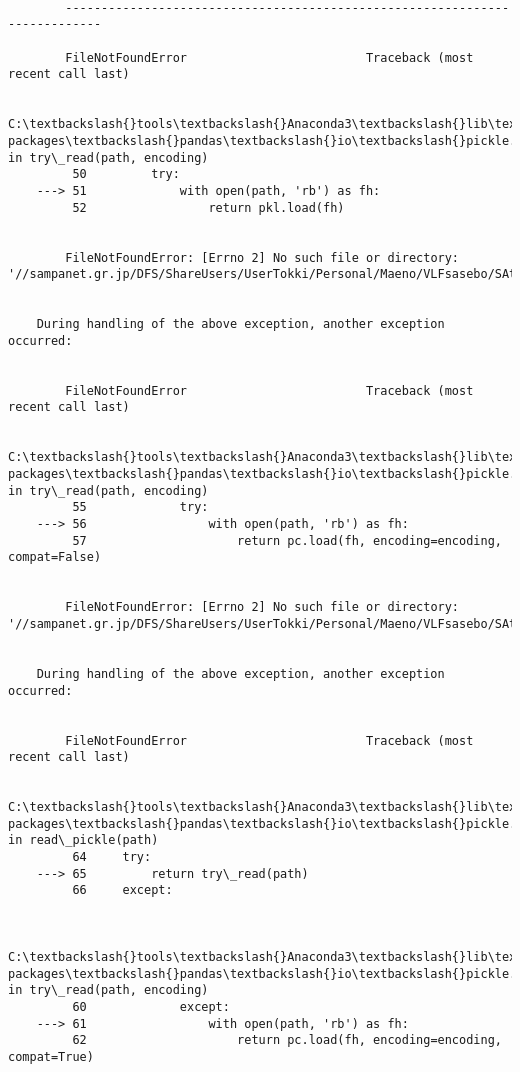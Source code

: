 \documentclass[a4paper,dvipdfmx]{jsarticle}
\begin{document}
    \begin{Verbatim}[commandchars=\\\{\}]

        ---------------------------------------------------------------------------

        FileNotFoundError                         Traceback (most recent call last)

        C:\textbackslash{}tools\textbackslash{}Anaconda3\textbackslash{}lib\textbackslash{}site-packages\textbackslash{}pandas\textbackslash{}io\textbackslash{}pickle.py in try\_read(path, encoding)
         50         try:
    ---> 51             with open(path, 'rb') as fh:
         52                 return pkl.load(fh)
    

        FileNotFoundError: [Errno 2] No such file or directory: '//sampanet.gr.jp/DFS/ShareUsers/UserTokki/Personal/Maeno/VLFsasebo/SAtraceViewResult/average\_SN.dump'

        
    During handling of the above exception, another exception occurred:
    

        FileNotFoundError                         Traceback (most recent call last)

        C:\textbackslash{}tools\textbackslash{}Anaconda3\textbackslash{}lib\textbackslash{}site-packages\textbackslash{}pandas\textbackslash{}io\textbackslash{}pickle.py in try\_read(path, encoding)
         55             try:
    ---> 56                 with open(path, 'rb') as fh:
         57                     return pc.load(fh, encoding=encoding, compat=False)
    

        FileNotFoundError: [Errno 2] No such file or directory: '//sampanet.gr.jp/DFS/ShareUsers/UserTokki/Personal/Maeno/VLFsasebo/SAtraceViewResult/average\_SN.dump'

        
    During handling of the above exception, another exception occurred:
    

        FileNotFoundError                         Traceback (most recent call last)

        C:\textbackslash{}tools\textbackslash{}Anaconda3\textbackslash{}lib\textbackslash{}site-packages\textbackslash{}pandas\textbackslash{}io\textbackslash{}pickle.py in read\_pickle(path)
         64     try:
    ---> 65         return try\_read(path)
         66     except:
    

        C:\textbackslash{}tools\textbackslash{}Anaconda3\textbackslash{}lib\textbackslash{}site-packages\textbackslash{}pandas\textbackslash{}io\textbackslash{}pickle.py in try\_read(path, encoding)
         60             except:
    ---> 61                 with open(path, 'rb') as fh:
         62                     return pc.load(fh, encoding=encoding, compat=True)
    


\end{Verbatim}
\end{document}
